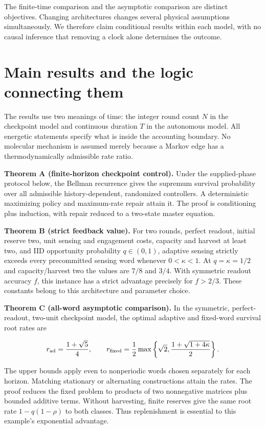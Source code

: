 \documentclass[
  11pt,
]{article}
\begin{document}
The finite-time comparison and the asymptotic comparison are distinct
objectives. Changing architectures changes several physical assumptions
simultaneously. We therefore claim conditional results within each
model, with no causal inference that removing a clock alone determines
the outcome.

\section{Main results and the logic connecting
them}\label{main-results-and-the-logic-connecting-them}

The results use two meanings of time: the integer round count \(N\) in
the checkpoint model and continuous duration \(T\) in the autonomous
model. All energetic statements specify what is inside the accounting
boundary. No molecular mechanism is assumed merely because a Markov edge
has a thermodynamically admissible rate ratio.

\textbf{Theorem A (finite-horizon checkpoint control).} Under the
supplied-phase protocol below, the Bellman recurrence gives the supremum
survival probability over all admissible history-dependent, randomized
controllers. A deterministic maximizing policy and maximum-rate repair
attain it. The proof is conditioning plus induction, with repair reduced
to a two-state master equation.

\textbf{Theorem B (strict feedback value).} For two rounds, perfect
readout, initial reserve two, unit sensing and engagement costs,
capacity and harvest at least two, and IID opportunity probability
\(q\in(0,1)\), adaptive sensing strictly exceeds every precommitted
sensing word whenever \(0<\kappa<1\). At \(q=\kappa=1/2\) and
capacity/harvest two the values are \(7/8\) and \(3/4\). With symmetric
readout accuracy \(f\), this instance has a strict advantage precisely
for \(f>2/3\). These constants belong to this architecture and parameter
choice.

\textbf{Theorem C (all-word asymptotic comparison).} In the symmetric,
perfect-readout, two-unit checkpoint model, the optimal adaptive and
fixed-word survival root rates are

\[
r_{\rm ad}=\frac{1+\sqrt5}{4},\qquad
r_{\rm fixed}=\frac12\max\left\{\sqrt2,\frac{1+\sqrt{1+4\kappa}}2\right\}.
\]

The upper bounds apply even to nonperiodic words chosen separately for
each horizon. Matching stationary or alternating constructions attain
the rates. The proof reduces the fixed problem to products of two
nonnegative matrices plus bounded additive terms. Without harvesting,
finite reserves give the same root rate \(1-q(1-\rho)\) to both classes.
Thus replenishment is essential to this example's exponential advantage.
\end{document}
